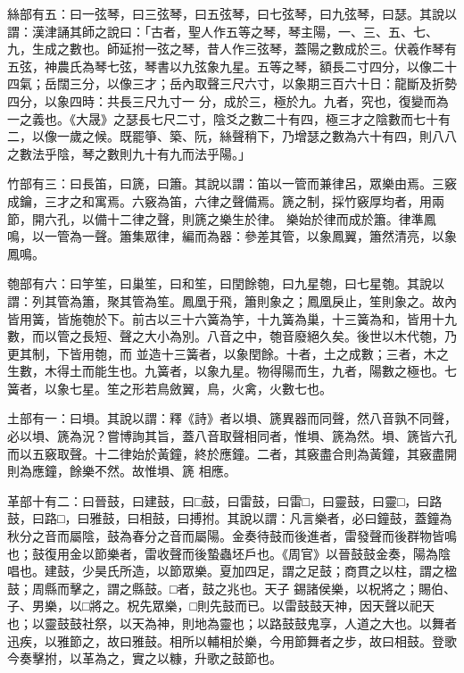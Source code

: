\begin{pinyinscope}
 絲部有五：曰一弦琴，曰三弦琴，曰五弦琴，曰七弦琴，曰九弦琴，曰瑟。其說以謂：漢津誦其師之說曰：「古者，聖人作五等之琴，琴主陽，一、三、五、七、九，生成之數也。師延拊一弦之琴，昔人作三弦琴，蓋陽之數成於三。伏羲作琴有五弦，神農氏為琴七弦，琴書以九弦象九星。五等之琴，額長二寸四分，以像二十四氣；岳闊三分，以像三才；岳內取聲三尺六寸，以象期三百六十日：龍斷及折勢四分，以象四時：共長三尺九寸一
 分，成於三，極於九。九者，究也，復變而為一之義也。《大晟》之瑟長七尺二寸，陰爻之數二十有四，極三才之陰數而七十有二，以像一歲之候。既罷箏、築、阮，絲聲稍下，乃增瑟之數為六十有四，則八八之數法乎陰，琴之數則九十有九而法乎陽。」



 竹部有三：曰長笛，曰篪，曰簫。其說以謂：笛以一管而兼律呂，眾樂由焉。三竅成鑰，三才之和寓焉。六竅為笛，六律之聲備焉。篪之制，採竹竅厚均者，用兩節，開六孔，以備十二律之聲，則篪之樂生於律。
 樂始於律而成於簫。律準鳳鳴，以一管為一聲。簫集眾律，編而為器：參差其管，以象鳳翼，簫然清亮，以象鳳鳴。



 匏部有六：曰竽笙，曰巢笙，曰和笙，曰閏餘匏，曰九星匏，曰七星匏。其說以謂：列其管為簫，聚其管為笙。鳳凰于飛，簫則象之；鳳凰戾止，笙則象之。故內皆用簧，皆施匏於下。前古以三十六簧為竽，十九簧為巢，十三簧為和，皆用十九數，而以管之長短、聲之大小為別。八音之中，匏音廢絕久矣。後世以木代匏，乃更其制，下皆用匏，而
 並造十三簧者，以象閏餘。十者，土之成數；三者，木之生數，木得土而能生也。九簧者，以象九星。物得陽而生，九者，陽數之極也。七簧者，以象七星。笙之形若鳥斂翼，鳥，火禽，火數七也。



 土部有一：曰塤。其說以謂：釋《詩》者以塤、篪異器而同聲，然八音孰不同聲，必以塤、篪為況？嘗博詢其旨，蓋八音取聲相同者，惟塤、篪為然。塤、篪皆六孔而以五竅取聲。十二律始於黃鐘，終於應鐘。二者，其竅盡合則為黃鐘，其竅盡開則為應鐘，餘樂不然。故惟塤、篪
 相應。



 革部十有二：曰晉鼓，曰建鼓，曰□鼓，曰雷鼓，曰雷□，曰靈鼓，曰靈□，曰路鼓，曰路□，曰雅鼓，曰相鼓，曰搏拊。其說以謂：凡言樂者，必曰鐘鼓，蓋鐘為秋分之音而屬陰，鼓為春分之音而屬陽。金奏待鼓而後進者，雷發聲而後群物皆鳴也；鼓復用金以節樂者，雷收聲而後蟄蟲坯戶也。《周官》以晉鼓鼓金奏，陽為陰唱也。建鼓，少昊氏所造，以節眾樂。夏加四足，謂之足鼓；商貫之以柱，謂之楹鼓；周縣而擊之，謂之縣鼓。□者，鼓之兆也。天子
 錫諸侯樂，以柷將之；賜伯、子、男樂，以□將之。柷先眾樂，□則先鼓而已。以雷鼓鼓天神，因天聲以祀天也；以靈鼓鼓社祭，以天為神，則地為靈也；以路鼓鼓鬼享，人道之大也。以舞者迅疾，以雅節之，故曰雅鼓。相所以輔相於樂，今用節舞者之步，故曰相鼓。登歌今奏擊拊，以革為之，實之以糠，升歌之鼓節也。




\end{pinyinscope}
